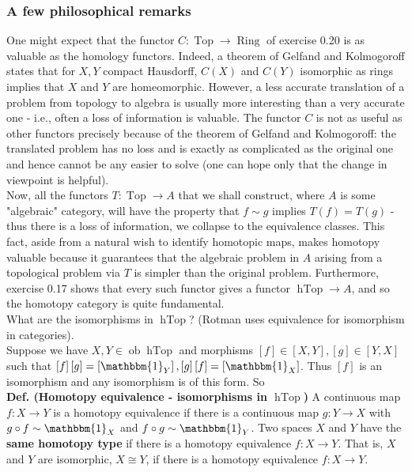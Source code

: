 \documentclass[a4paper]{article}
\theoremstyle{plain}%
\theoremstyle{definition}
\theoremstyle{remark}
\DeclareMathOperator{\ob}{ob}
\DeclareMathOperator{\Ring}{Ring}
\DeclareMathOperator{\Top}{Top}
\DeclareMathOperator{\hTop}{hTop}
\begin{document}
\subsubsection*{A few philosophical remarks}
One might expect that the functor $C  \colon \Top \to \Ring$ of
exercise 0.20 is as valuable as the homology functors. Indeed, a
theorem of Gelfand and Kolmogoroff states that for $X,Y$ compact Hausdorff,
$C(X)$ and $C(Y)$ isomorphic as rings implies that
$X$ and $Y$ are homeomorphic. However, a less accurate translation of a problem
from topology to algebra is usually more interesting than a very accurate one
- i.e., often a loss of information is valuable. The functor $C$ is not as
useful as other functors precisely because of the theorem of Gelfand and
Kolmogoroff: the translated problem has no loss and is exactly as complicated
as the original one and hence cannot be any easier to solve (one can hope only
that the change in viewpoint is helpful).\\
\linebreak
Now, all the functors $T  \colon \Top \to A$ that we shall construct, where $A$
is some "algebraic" category, will have the property that
$f \sim g$ implies $T(f) = T(g)$ - thus there is a loss of information, we
collapse to the equivalence classes. This fact, aside from a natural wish to
identify homotopic maps, makes homotopy valuable because it guarantees that the
algebraic problem in $A$ arising from a topological problem
via $T$ is simpler than the original problem. Furthermore, exercise
0.17 shows that every such functor gives a functor
$\hTop \to A$, and so the homotopy category is quite fundamental.\\
\linebreak
What are the isomorphisms in $\hTop$? (Rotman uses equivalence for isomorphism
in categories).\\
\linebreak
Suppose we have $X,Y \in \ob \hTop$ and
morphisms $\left[ f \right] \in \left[ X,Y \right] ,
\left[ g \right] \in \left[ Y,X \right] $ such that
$\left[ f \right] \left[ g \right] = \left[ \mathbbm{1}_{Y} \right] ,
\left[ g \right] \left[ f \right] = \left[ \mathbbm{1}_{X} \right] $.
Thus $\left[ f \right] $ is an isomorphism and any 
isomorphism is of this form. So\\
\linebreak
\textbf{Def. (Homotopy equivalence - isomorphisms in $\hTop$)} 
A continuous map $f  \colon X \to Y$ is a homotopy equivalence
if there is a continuous map $g  \colon Y \to X$ with
$g \circ f \sim \mathbbm{1}_{X}$ and $f \circ g \sim \mathbbm{1}_{Y}$. Two
spaces $X$ and $Y$ have the \textbf{same homotopy type} if there is a homotopy
equivalence $f  \colon X \to Y$. That is, $X$ and $Y$ are isomorphic,
$X \cong Y$, if there
is a homotopy equivalence $f  \colon X \to Y$.\\
\linebreak
\end{document}
